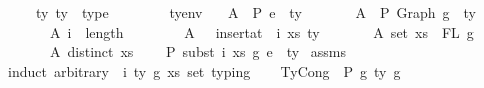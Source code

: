 \begin{isabellebody}
\ \ \ \ \ ty{}\ ty{}\ {\isacharcolon}{\kern0pt}{\isacharcolon}{\kern0pt}\ type\isanewline
\ \ \ \ \ {\isasymGamma}{}\ {\isasymGamma}{}\ {\isacharcolon}{\kern0pt}{\isacharcolon}{\kern0pt}\ tyenv\isanewline
\ \ \ A{}{\isacharcolon}{\kern0pt}\ {\isachardoublequoteopen}{\isasymGamma}{}\ {\isasymturnstile}{\isacharbraceleft}{\kern0pt}P{\isacharbraceright}{\kern0pt}\ e{}\ {\isacharcolon}{\kern0pt}\ ty{}{\isachardoublequoteclose}\isanewline
\ \ \ \ \ \ \ A{}{\isacharcolon}{\kern0pt}\ {\isachardoublequoteopen}{\isasymGamma}{}\ {\isasymturnstile}{\isacharbraceleft}{\kern0pt}P{\isacharbraceright}{\kern0pt}\ Graph\ g{}\ {\isacharcolon}{\kern0pt}\ ty{}{\isachardoublequoteclose}\isanewline
\ \ \ \ \ \ \ A{}{\isacharcolon}{\kern0pt}\ {\isachardoublequoteopen}i\ {\isasymle}\ length\ {\isasymGamma}{}{\isachardoublequoteclose}\isanewline
\ \ \ \ \ \ \ A{}{\isacharcolon}{\kern0pt}\ {\isachardoublequoteopen}{\isasymGamma}{}\ {\isacharequal}{\kern0pt}\ insert{\isacharunderscore}{\kern0pt}at\ {\isasymGamma}{}\ i\ {\isacharparenleft}{\kern0pt}xs{\isacharcomma}{\kern0pt}\ ty{}{\isacharparenright}{\kern0pt}{\isachardoublequoteclose}\isanewline
\ \ \ \ \ \ \ A{}{\isacharcolon}{\kern0pt}\ {\isachardoublequoteopen}set\ xs\ {\isacharequal}{\kern0pt}\ FL\ g{}{\isachardoublequoteclose}\isanewline
\ \ \ \ \ \ \ A{}{\isacharcolon}{\kern0pt}\ {\isachardoublequoteopen}distinct\ xs{\isachardoublequoteclose}\isanewline
\ \ \ {\isachardoublequoteopen}{\isasymGamma}{}\ {\isasymturnstile}{\isacharbraceleft}{\kern0pt}P{\isacharbraceright}{\kern0pt}\ subst\ i\ xs\ g{}\ e{}\ {\isacharcolon}{\kern0pt}\ ty{}{\isachardoublequoteclose}\isanewline
%
\isadelimproof
%
\endisadelimproof
%
\isatagproof
{}\isamarkupfalse%
\ assms\isanewline
{}\isamarkupfalse%
\ {\isacharparenleft}{\kern0pt}induct\ arbitrary{\isacharcolon}{\kern0pt}\ {\isasymGamma}{}\ i\ ty{}\ g{}\ xs\ set{\isacharcolon}{\kern0pt}\ typing{\isacharparenright}{\kern0pt}\isanewline
\isanewline
\ \ \isamarkupfalse%
\ {\isacharparenleft}{\kern0pt}TyCong\ {\isasymGamma}{\isacharprime}{\kern0pt}\ P\ g{}{\isacharprime}{\kern0pt}\ ty{\isacharprime}{\kern0pt}\ g{}{\isacharprime}{\kern0pt}{\isacharparenright}{\kern0pt}\isanewline

\end{isabellebody}
